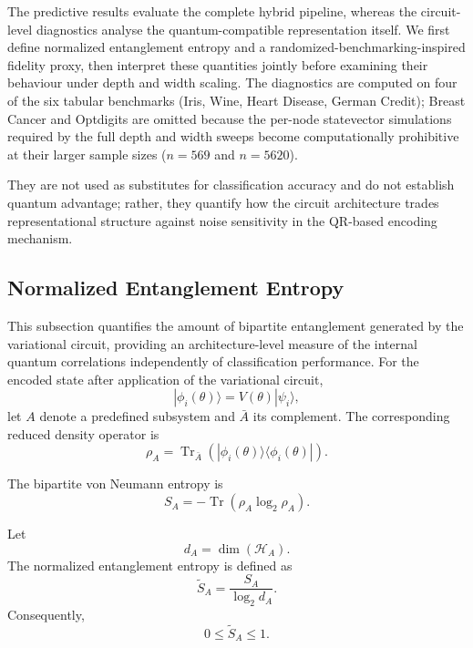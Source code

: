 \documentclass[11pt,a4paper]{article}
\begin{document}
The predictive results evaluate the complete hybrid pipeline, whereas the
circuit-level diagnostics analyse the quantum-compatible representation itself.
We first define normalized entanglement entropy and a
randomized-benchmarking-inspired fidelity proxy, then interpret these quantities
jointly before examining their behaviour under depth and width scaling. The
diagnostics are computed on four of the six tabular benchmarks (Iris, Wine,
Heart Disease, German Credit); Breast Cancer and Optdigits are omitted
because the per-node statevector simulations required by the full depth and
width sweeps become computationally prohibitive at their larger sample
sizes ($n=569$ and $n=5620$).

They are not used as substitutes for classification
accuracy and do not establish quantum advantage; rather, they quantify how the
circuit architecture trades representational structure against noise
sensitivity in the QR-based encoding mechanism.

\subsection{Normalized Entanglement Entropy}
\label{sec:entropy}

This subsection quantifies the amount of bipartite entanglement generated by
the variational circuit, providing an architecture-level measure of the
internal quantum correlations independently of classification performance.
For the encoded state after application of the variational circuit,
\begin{equation}
|\phi_i(\theta)\rangle
=
V(\theta)|\psi_i\rangle,
\end{equation}
let \(A\) denote a predefined subsystem and \(\bar{A}\) its complement. The
corresponding reduced density operator is
\begin{equation}
\rho_A
=
\operatorname{Tr}_{\bar{A}}
\left(
|\phi_i(\theta)\rangle
\langle\phi_i(\theta)|
\right).
\end{equation}

The bipartite von Neumann entropy is
\begin{equation}
S_A
=
-\operatorname{Tr}
\left(
\rho_A\log_2\rho_A
\right).
\label{eq:entropy}
\end{equation}

Let
\begin{equation}
d_A
=
\dim(\mathcal{H}_A).
\end{equation}
The normalized entanglement entropy is defined as
\begin{equation}
{
\widetilde{S}_A
=
\frac{S_A}{\log_2 d_A}.
}
\label{eq:normalized-entropy}
\end{equation}
Consequently,
\begin{equation}
0
\leq
\widetilde{S}_A
\leq
1.
\end{equation}
\end{document}
